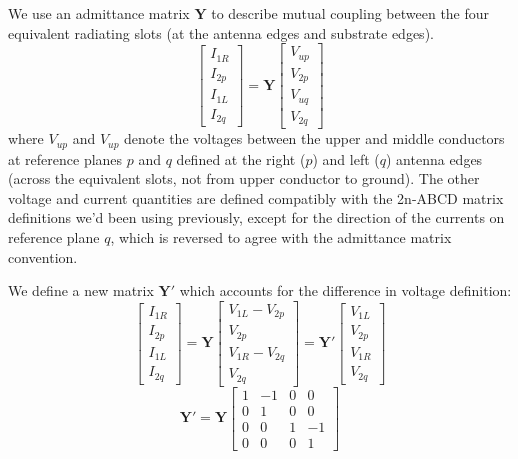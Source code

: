 \documentclass{article}
\begin{document}
We use an admittance matrix $\mathbf{Y}$ to describe mutual coupling between the four equivalent radiating slots (at the antenna edges and substrate edges).  
\begin{equation}
\begin{bmatrix}I_{1R} \\ I_{2p}\\I_{1L}\\I_{2q}\end{bmatrix} = \mathbf{Y} \begin{bmatrix}V_{up} \\ V_{2p}\\V_{uq}\\V_{2q}\end{bmatrix}
\end{equation}
where $V_{up}$ and $V_{up}$ denote the voltages between the upper and middle conductors at reference planes $p$ and $q$ defined at the right ($p$) and left ($q$) antenna edges (across the equivalent slots, not from upper conductor to ground).  The other voltage and current quantities are defined compatibly with the 2n-ABCD matrix definitions we'd been using previously, except for the direction of the currents on reference plane $q$, which is reversed to agree with the admittance matrix convention.  

We define a new matrix $\mathbf{Y'}$ which accounts for the difference in voltage definition:
\begin{equation}
\begin{bmatrix}I_{1R}\\ I_{2p}\\I_{1L}\\I_{2q}\end{bmatrix} = \mathbf{Y} \begin{bmatrix}V_{1L}-V_{2p} \\ V_{2p}\\V_{1R}-V_{2q}\\V_{2q}\end{bmatrix} = \mathbf{Y'}\begin{bmatrix}V_{1L} \\ V_{2p}\\V_{1R}\\V_{2q}\end{bmatrix}
\end{equation}
\begin{equation}
\mathbf{Y'}=\mathbf{Y}\begin{bmatrix}1 & -1 & 0 & 0\\ 0 & 1 & 0 & 0 \\ 0 & 0 & 1 & -1\\ 0 & 0 & 0& 1\end{bmatrix}
\end{equation}
\end{document}
